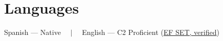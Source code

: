 \fi

\ifonepage\else
\section{Languages}
Spanish --- Native \ \ {\color{subtle}$\vert$} \ \ English --- C2 Proficient
(\href{https://cert.efset.org/es/qpqdd3}{EF SET, verified})
\fi


